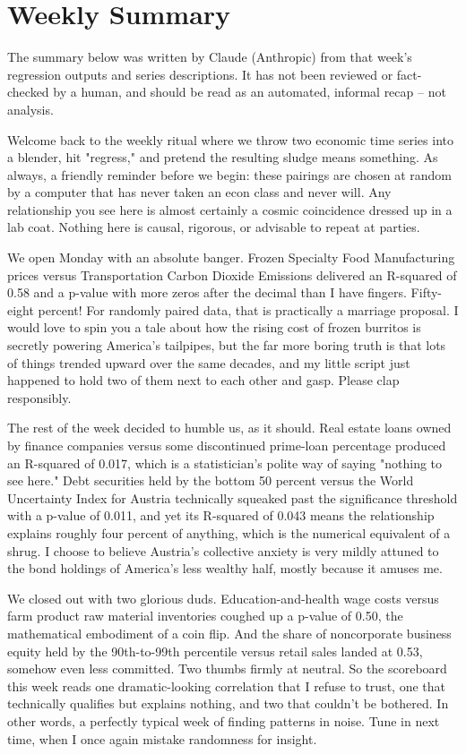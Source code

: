 \section{Weekly Summary}

\begin{tcolorbox}[colback=yellow!10,colframe=black!50,title=AI-Generated Content]
\noindent The summary below was written by Claude (Anthropic) from that week's regression outputs and series descriptions. It has not been reviewed or fact-checked by a human, and should be read as an automated, informal recap -- not analysis.
\end{tcolorbox}

Welcome back to the weekly ritual where we throw two economic time series into a blender, hit "regress," and pretend the resulting sludge means something. As always, a friendly reminder before we begin: these pairings are chosen at random by a computer that has never taken an econ class and never will. Any relationship you see here is almost certainly a cosmic coincidence dressed up in a lab coat. Nothing here is causal, rigorous, or advisable to repeat at parties.

We open Monday with an absolute banger. Frozen Specialty Food Manufacturing prices versus Transportation Carbon Dioxide Emissions delivered an R-squared of 0.58 and a p-value with more zeros after the decimal than I have fingers. Fifty-eight percent! For randomly paired data, that is practically a marriage proposal. I would love to spin you a tale about how the rising cost of frozen burritos is secretly powering America's tailpipes, but the far more boring truth is that lots of things trended upward over the same decades, and my little script just happened to hold two of them next to each other and gasp. Please clap responsibly.

The rest of the week decided to humble us, as it should. Real estate loans owned by finance companies versus some discontinued prime-loan percentage produced an R-squared of 0.017, which is a statistician's polite way of saying "nothing to see here." Debt securities held by the bottom 50 percent versus the World Uncertainty Index for Austria technically squeaked past the significance threshold with a p-value of 0.011, and yet its R-squared of 0.043 means the relationship explains roughly four percent of anything, which is the numerical equivalent of a shrug. I choose to believe Austria's collective anxiety is very mildly attuned to the bond holdings of America's less wealthy half, mostly because it amuses me.

We closed out with two glorious duds. Education-and-health wage costs versus farm product raw material inventories coughed up a p-value of 0.50, the mathematical embodiment of a coin flip. And the share of noncorporate business equity held by the 90th-to-99th percentile versus retail sales landed at 0.53, somehow even less committed. Two thumbs firmly at neutral. So the scoreboard this week reads one dramatic-looking correlation that I refuse to trust, one that technically qualifies but explains nothing, and two that couldn't be bothered. In other words, a perfectly typical week of finding patterns in noise. Tune in next time, when I once again mistake randomness for insight.
